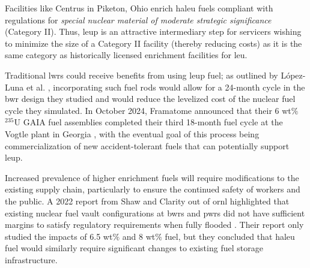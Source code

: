Facilities like Centrus in Piketon, Ohio enrich \gls{haleu} fuels compliant with regulations for \textit{special nuclear material of moderate strategic significance} (Category II). Thus, \gls{leup} is an attractive intermediary step for servicers wishing to minimize the size of a Category II facility (thereby reducing costs) as it is the same category as historically licensed enrichment facilities for \gls{leu}.

Traditional \glspl{lwr} could receive benefits from using \gls{leup} fuel; as outlined by L\'{o}pez-Luna et al. \cite{24_month_cycle_bwr}, incorporating such fuel rods would allow for a 24-month cycle in the \gls{bwr} design they studied and would reduce the levelized cost of the nuclear fuel cycle they simulated. In October 2024, Framatome announced that their 6 wt$\%$ $^{235}$U GAIA fuel assemblies completed their third 18-month fuel cycle at the Vogtle plant in Georgia \cite{framatome_press_2024}, with the eventual goal of this process being commercialization of new accident-tolerant fuels that can potentially support \gls{leup}.

Increased prevalence of higher enrichment fuels will require modifications to the existing supply chain, particularly to ensure the continued safety of workers and the public. A 2022 report from Shaw and Clarity out of \gls{ornl} highlighted that existing nuclear fuel vault configurations at \glspl{bwr} and \glspl{pwr} did not have sufficient margins to satisfy regulatory requirements when fully flooded \cite{leup_atf_storage_impacts}. Their report only studied the impacts of 6.5 wt$\%$ and 8 wt$\%$ fuel, but they concluded that \gls{haleu} fuel would similarly require significant changes to existing fuel storage infrastructure.